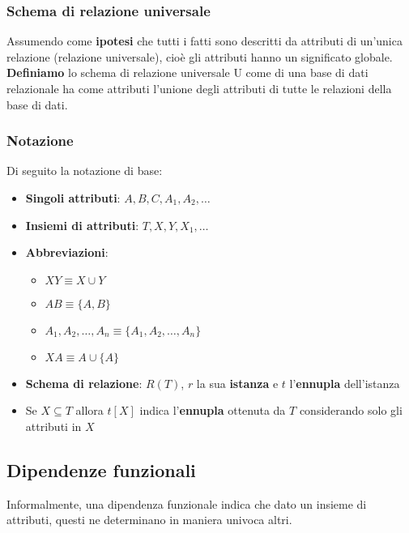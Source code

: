 \subsubsection{Schema di relazione universale}
\begin{definition}
	Assumendo come \textbf{ipotesi} che tutti i fatti sono descritti da attributi di un’unica relazione
	(relazione universale), cioè gli attributi hanno un significato globale.\\
	\textbf{Definiamo} lo schema di relazione universale U come di una base di dati relazionale ha come attributi l’unione degli attributi di tutte le relazioni della base di dati.
\end{definition}

\subsubsection{Notazione}
Di seguito la notazione di base:
\begin{itemize}
	\item \textbf{Singoli attributi}: $A,B,C, A_1, A_2, \ldots$
	\item \textbf{Insiemi di attributi}: $T,X,Y,X_1, \ldots$
	\item \textbf{Abbreviazioni}:
	\begin{itemize}
		\item $XY \equiv X \cup Y$
		\item $AB \equiv \{A, B\}$
		\item $A_1, A_2, \ldots, A_n \equiv \{A_1, A_2, \ldots, A_n\}$
		\item $XA \equiv A \cup \{A\}$
	\end{itemize} 
	\item \textbf{Schema di relazione}: $R(T)$, $r$ la sua \textbf{istanza} e $t$ l'\textbf{ennupla} dell'istanza
	\item Se $X \subseteq T$ allora $t[X]$ indica l'\textbf{ennupla} ottenuta da $T$ considerando solo gli attributi in $X$
\end{itemize}


\subsection{Dipendenze funzionali}
Informalmente, una dipendenza funzionale indica che dato un insieme di attributi, questi ne determinano in maniera univoca altri.

